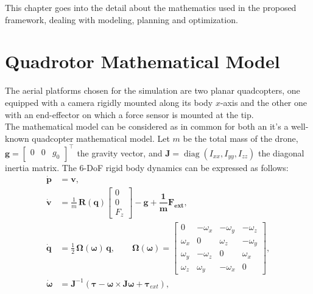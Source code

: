 This chapter goes into the detail about the mathematics used in the proposed framework, dealing with modeling, planning and optimization.
\section{Quadrotor Mathematical Model}
The aerial platforms chosen for the simulation are two planar quadcopters, one equipped with a camera rigidly mounted along its body $x$-axis and the other one with an end-effector on which a force sensor is mounted at the tip. 
\\The mathematical model can be considered as in common for both an it's a well-known quadcopter mathematical model. Let $m$ be the total mass of the drone, $\mathbf{g}=\begin{bmatrix}0 & 0 & g_0\end{bmatrix}^\top$ the gravity vector, and $\mathbf{J}=\operatorname{diag}(I_{xx},I_{yy},I_{zz})$ the diagonal inertia matrix. The 6-DoF rigid body dynamics can be expressed as follows:
\begin{equation} \label{eq:quadrotor_model}
\begin{aligned}
\dot{\mathbf{p}} &= \mathbf{v},\\
\dot{\mathbf{v}} &= \frac{1}{m}\,\mathbf{R}(\mathbf{q}) \begin{bmatrix}0\\[1mm]0\\[1mm]F_z\end{bmatrix} - \mathbf{g + \dfrac{1}{m} F_{ext}},\\
\dot{\mathbf{q}} &= \tfrac{1}{2}\,\boldsymbol{\Omega}(\boldsymbol{\omega})\,\mathbf{q}, \qquad 
\boldsymbol{\Omega}(\boldsymbol{\omega}) \!=\! \begin{bmatrix}
0 & -\omega_x & -\omega_y & -\omega_z\\
\omega_x & 0 & \omega_z & -\omega_y\\
\omega_y & -\omega_z & 0 & \omega_x\\
\omega_z & \omega_y & -\omega_x & 0
\end{bmatrix},\\
\dot{\boldsymbol{\omega}} &= \mathbf{J}^{-1}\!\left(\boldsymbol{\tau} - \boldsymbol{\omega} \times \mathbf{J}\boldsymbol{\omega}+\boldsymbol{\tau}_{ext}\right),
\end{aligned}
\end{equation}

